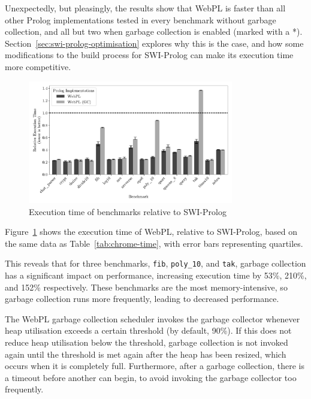 \vspace*{-1.5em}

Unexpectedly, but pleasingly, the results show that WebPL is faster than all other Prolog implementations tested in every benchmark without garbage collection, and all but two when garbage collection is enabled (marked with a *). Section~\ref{sec:swi-prolog-optimisation} explores why this is the case, and how some modifications to the build process for SWI-Prolog can make its execution time more competitive.

\begin{figure}[H]
\centering
\includegraphics[width=0.8\textwidth]{relative_performance.pdf}
\caption{Execution time of benchmarks relative to SWI-Prolog}
\label{fig:relative-performance}
\end{figure}

Figure~\ref{fig:relative-performance} shows the execution time of WebPL, relative to SWI-Prolog, based on the same data as Table~\ref{tab:chrome-time}, with error bars representing quartiles.

This reveals that for three benchmarks, \texttt{fib}, \texttt{poly\_10}, and \texttt{tak}, garbage collection has a significant impact on performance, increasing execution time by 53\%, 210\%, and 152\% respectively. These benchmarks are the most memory-intensive, so garbage collection runs more frequently, leading to decreased performance.

The WebPL garbage collection scheduler invokes the garbage collector whenever heap utilisation exceeds a certain threshold (by default, 90\%). If this does not reduce heap utilisation below the threshold, garbage collection is not invoked again until the threshold is met again after the heap has been resized, which occurs when it is completely full. Furthermore, after a garbage collection, there is a timeout before another can begin, to avoid invoking the garbage collector too frequently.

